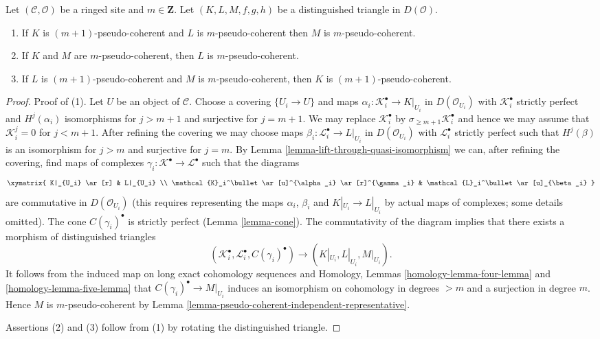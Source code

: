 \begin{lemma}
\label{lemma-cone-pseudo-coherent}
Let $(\mathcal{C}, \mathcal{O})$ be a ringed site and $m \in \mathbf{Z}$.
Let $(K, L, M, f, g, h)$ be a distinguished triangle in $D(\mathcal{O})$.
\begin{enumerate}
\item If $K$ is $(m + 1)$-pseudo-coherent and $L$ is $m$-pseudo-coherent
then $M$ is $m$-pseudo-coherent.
\item If $K$ and $M$ are $m$-pseudo-coherent, then $L$ is $m$-pseudo-coherent.
\item If $L$ is $(m + 1)$-pseudo-coherent and $M$
is $m$-pseudo-coherent, then $K$ is $(m + 1)$-pseudo-coherent.
\end{enumerate}
\end{lemma}

\begin{proof}
Proof of (1). Let $U$ be an object of $\mathcal{C}$. Choose a covering
$\{U_i \to U\}$ and maps $\alpha_i : \mathcal{K}_i^\bullet \to K|_{U_i}$
in $D(\mathcal{O}_{U_i})$ with $\mathcal{K}_i^\bullet$ strictly perfect and
$H^j(\alpha_i)$ isomorphisms for $j > m + 1$ and surjective for $j = m + 1$.
We may replace $\mathcal{K}_i^\bullet$ by
$\sigma_{\geq m + 1}\mathcal{K}_i^\bullet$
and hence we may assume that $\mathcal{K}_i^j = 0$
for $j < m + 1$. After refining the covering we may choose
maps $\beta_i : \mathcal{L}_i^\bullet \to L|_{U_i}$ in $D(\mathcal{O}_{U_i})$
with $\mathcal{L}_i^\bullet$ strictly perfect such that
$H^j(\beta)$ is an isomorphism for $j > m$ and
surjective for $j = m$. By
Lemma \ref{lemma-lift-through-quasi-isomorphism}
we can, after refining the covering, find maps of complexes
$\gamma_i : \mathcal{K}^\bullet \to \mathcal{L}^\bullet$
such that the diagrams
$$
\xymatrix{
K|_{U_i} \ar[r] & L|_{U_i} \\
\mathcal{K}_i^\bullet \ar[u]^{\alpha_i} \ar[r]^{\gamma_i} &
\mathcal{L}_i^\bullet \ar[u]_{\beta_i}
}
$$
are commutative in $D(\mathcal{O}_{U_i})$ (this requires representing the
maps $\alpha_i$, $\beta_i$ and $K|_{U_i} \to L|_{U_i}$
by actual maps of complexes; some details omitted).
The cone $C(\gamma_i)^\bullet$ is strictly perfect (Lemma \ref{lemma-cone}).
The commutativity of the diagram implies that there exists a morphism
of distinguished triangles
$$
(\mathcal{K}_i^\bullet, \mathcal{L}_i^\bullet, C(\gamma_i)^\bullet)
\longrightarrow
(K|_{U_i}, L|_{U_i}, M|_{U_i}).
$$
It follows from the induced map on long exact cohomology sequences and
Homology, Lemmas \ref{homology-lemma-four-lemma} and
\ref{homology-lemma-five-lemma}
that $C(\gamma_i)^\bullet \to M|_{U_i}$ induces an isomorphism
on cohomology in degrees $> m$ and a surjection in degree $m$.
Hence $M$ is $m$-pseudo-coherent by
Lemma \ref{lemma-pseudo-coherent-independent-representative}.

\medskip\noindent
Assertions (2) and (3) follow from (1) by rotating the distinguished
triangle.
\end{proof}

